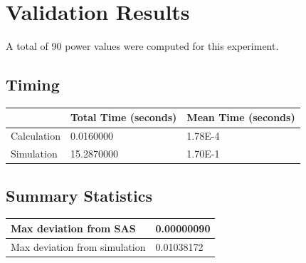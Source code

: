 \documentclass{glimmpse-report}
\begin{document}
\section{Validation Results}
A total of 90 power values were computed for this experiment.

\subsection{Timing}
\begin{tabular}{|l|l|l|}
\hline
 & Total Time (seconds) & Mean Time (seconds) \\ 
\hline
Calculation & 0.0160000 & 1.78E-4\tabularnewline
\hline
Simulation & 15.2870000 & 1.70E-1\tabularnewline
\hline
\end{tabular}
\subsection{Summary Statistics}
\begin{tabular}{|l|l|}
\hline
Max deviation from SAS & 0.00000090\tabularnewline
\hline

Max deviation from simulation & 0.01038172\tabularnewline
\hline

\end{tabular}
\end{document}
